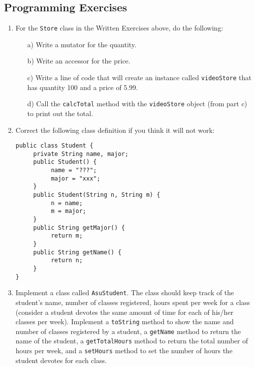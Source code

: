 \subsection{Programming Exercises}

\begin{enumerate}

\item For the \verb|Store| class in the Written Exercises above, do the following:
\begin{enumerate}
\item[a)]Write a mutator for the quantity.
\item[b)]Write an accessor for the price.
\item[c)]Write a line of code that will create an instance called \verb|videoStore| that has quantity 100 and a price of 5.99.
\item[d)]Call the \verb|calcTotal| method with the \verb|videoStore| object (from part c) to print out the total.
\end{enumerate}

\item Correct the following class definition if you think it will not work:
\begin{lstlisting}
public class Student {
     private String name, major;
     public Student() {
          name = "???";
          major = "xxx";
     }
     public Student(String n, String m) {
          n = name;
          m = major;
     }
     public String getMajor() {
          return m;
     }
     public String getName() {
          return n;
     }
}
\end{lstlisting}

\item Implement a class called \verb|AsuStudent|. The class should keep track of the student's name, number of classes registered, hours spent per week for a class (consider a student devotes the same amount of time for each of his/her classes per week). Implement a \verb|toString| method to show the name and number of classes registered by a student, a \verb|getName| method to return the name of the student, a \verb|getTotalHours| method to return the total number of hours per week, and a \verb|setHours| method to set the number of hours the student devotes for each class.

\end{enumerate}